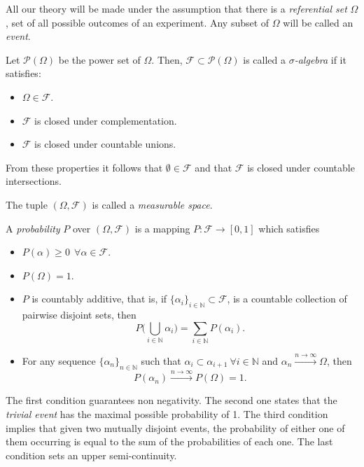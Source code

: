 
All our theory will be made under the assumption that there is a
\emph{referential set} \(\Omega\), set of all possible outcomes of an experiment. Any subset of
\(\Omega\) will be called an \emph{event}.

\begin{definition}
Let \(\mathcal{P}(\Omega)\) be the power set of \(\Omega\). Then, \(\mathcal{F} \subset \mathcal{P}(\Omega)\) is called a
\emph{\(\sigma\)-algebra} if it satisfies:
\begin{itemize}
\item \(\Omega \in \mathcal{F}\).
\item \(\mathcal{F}\) is closed under complementation.
\item \(\mathcal{F}\) is closed under countable unions.
\end{itemize}
From these properties it follows that \(\emptyset \in \mathcal{F}\) and that \(\mathcal{F}\)
is closed under countable intersections.

The tuple \((\Omega, \mathcal{F})\) is called a \emph{measurable space}.
\end{definition}

\begin{definition}
A \emph{probability} \(P\) over \((\Omega, \mathcal{F})\) is a mapping
\(P: \mathcal{F} \to [0,1]\) which satisfies
\begin{itemize}
\item \(P(\alpha) \geq 0 \ \ \forall \alpha \in \mathcal{F}\).
\item \(P(\Omega) = 1\).
\item \(P\) is countably additive, that is, if \(\{\alpha_i\}_{i \in \mathbb{N}}
  \subset \mathcal{F}\), is a countable collection of pairwise disjoint sets,
  then
  \[
  P\big(\bigcup_{i\in \mathbb{N}}\alpha_i\big) = \sum_{i\in \mathbb{N}}P(\alpha_i).
  \]
\item For any sequence {\(\{\alpha_n\}_{n \in \mathbb{N}}\)} such that \(\alpha_i \subset
  \alpha_{i+1} \ \forall i \in \mathbb{N}\) and \(\alpha_n
  \xrightarrow{n \to \infty} \Omega\), then
  \[P(\alpha_n)
  \xrightarrow{n \to \infty} P(\Omega) = 1.\]
\end{itemize}
\end{definition}

The first condition guarantees non negativity. The second one states that the
\emph{trivial event} has the maximal possible probability of 1. The third condition implies that given two mutually disjoint events,
the probability of either one of them occurring is equal to the sum of the
probabilities of each one. The last condition sets an upper semi-continuity.

